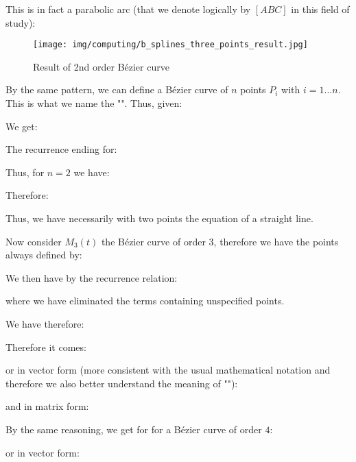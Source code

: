 	This is in fact a parabolic arc (that we denote logically by $[ABC]$ in this field of study):
	\begin{figure}[H]
		\centering
		\texttt{[image: img/computing/b\_splines\_three\_points\_result.jpg]}
		\caption[]{Result of 2nd order Bézier curve}
	\end{figure}
	By the same pattern, we can define a Bézier curve of $n$ points $P_i$ with $i=1...n$. This is what we name the "". Thus, given:
	
	We get:
	
	The recurrence ending for:
	
	Thus, for $n=2$ we have:
	
	Therefore:
	
	Thus, we have necessarily with two points the equation of a straight line.
	
	Now consider $M_3(t)$ the Bézier curve of order $3$, therefore we have the points always defined by:
	
	We then have by the recurrence relation:
	
	where we have eliminated the terms containing unspecified points.
	
	We have therefore:
	
	Therefore it comes:
	
	or in vector form (more consistent with the usual mathematical notation and therefore we also better understand the meaning of ""):
	
	and in matrix form:
	
	By the same reasoning, we get for for a Bézier curve of order $4$:
	
	or in vector form:
	
